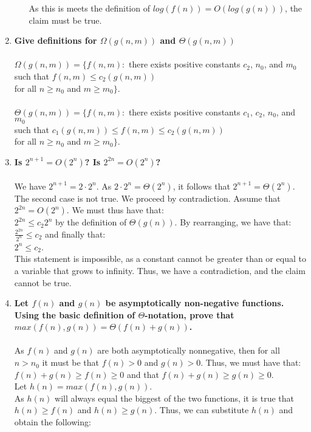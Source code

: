 \documentclass{article}
\begin{document}
\begin{enumerate}
\begin{enumerate}
			As this is meets the definition of $log(f(n))=O(log(g(n)))$, the claim must be true.
	\end{enumerate}
	\setcounter{enumi}{5}
	\item \textbf{Give definitions for $\Omega(g(n,m))$ and $\Theta(g(n,m))$} \\
		\\ $\Omega(g(n,m))=\{ f(n,m): $ there exists positive constants $c_2$, $n_0$, and $m_0$
		\\ such that $f(n,m)\leq c_2(g(n,m))$
		\\ for all $n\geq n_0$ and $m\geq m_0\}$. 
		\\ \\ $\Theta(g(n,m))=\{ f(n,m): $ there exists positive constants $c_1$, $c_2$, $n_0$, and $m_0$
		\\ such that $c_1(g(n,m))\leq f(n,m)\leq c_2(g(n,m))$
		\\ for all $n\geq n_0$ and $m\geq m_0\}$. 
	\item \textbf{Is $2^{n+1}=O(2^n)$? Is $2^{2n}=O(2^n)$?}
		\\ \\ We have $2^{n+1}=2\cdot2^n$. As $2\cdot 2^n = \Theta(2^n)$, it follows that $2^{n+1} = \Theta(2^n)$.
		\\ The second case is not true. We proceed by contradiction. Assume that $2^{2n}=O(2^n)$. We must thus have that:
		\\ $2^{2n}\leq c_2 2^n$ by the definition of $\Theta(g(n))$. By rearranging, we have that:
		\\ $\frac{2^{2n}}{2^n}\leq c_2 $ and finally that:
		\\ $2^n \leq c_2 $.
		\\ This statement is impossible, as a constant cannot be greater than or equal to a variable that grows to infinity. Thus, we have a contradiction, and the claim cannot be true.
	\setcounter{enumi}{5}
	\item \textbf{Let $f(n)$ and $g(n)$ be asymptotically non-negative functions. Using the basic definition of $\Theta$-notation, prove  that $max(f(n),g(n))= \Theta(f(n)+g(n))$.} \\
	\\ As $f(n)$ and $g(n)$ are both asymptotically nonnegative, then for all $n>n_0$ it must be that $f(n)>0$ and $g(n)>0$. Thus, we must have that:
	\\ $f(n)+g(n)\geq f(n) \geq 0$ and that $f(n)+g(n)\geq g(n) \geq 0$.
	\\ Let $h(n)=max(f(n),g(n))$.
	\\ As $h(n)$ will always equal the biggest of the two functions, it is true that $h(n)\geq f(n)$ and $h(n)\geq g(n)$. Thus, we can substitute $h(n)$ and obtain the following:

\end{enumerate}
\end{document}
